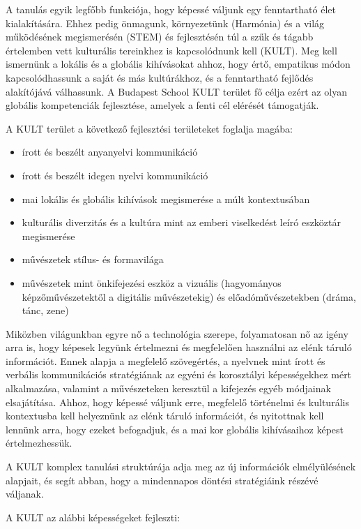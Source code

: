 A tanulás egyik legfőbb funkciója, hogy képessé váljunk egy fenntartható
élet kialakítására. Ehhez pedig önmagunk, környezetünk (Harmónia) és a
világ működésének megismerésén (STEM) és fejlesztésén túl a szűk és
tágabb értelemben vett kulturális tereinkhez is kapcsolódnunk kell
(KULT). Meg kell ismernünk a lokális és a globális kihívásokat ahhoz,
hogy értő, empatikus módon kapcsolódhassunk a saját és más kultúrákhoz,
és a fenntartható fejlődés alakítójává válhassunk. A Budapest \mbox{School}
KULT terület fő célja ezért az olyan globális kompetenciák fejlesztése,
amelyek a fenti cél elérését támogatják.

A KULT terület a következő fejlesztési területeket foglalja magába:

\begin{itemize}
\item
  írott és beszélt anyanyelvi kommunikáció
\item
  írott és beszélt idegen nyelvi kommunikáció
\item
  mai lokális és globális kihívások megismerése a múlt kontextusában
\item
  kulturális diverzitás és a kultúra mint az emberi viselkedést leíró
  eszköztár megismerése
\item
  művészetek stílus- és formavilága
\item
  művészetek mint önkifejezési eszköz a vizuális (hagyományos
  képzőművészetektől a digitális művészetekig) és előadóművészetekben
  (dráma, tánc, zene)
\end{itemize}

Miközben világunkban egyre nő a technológia szerepe, folyamatosan nő az
igény arra is, hogy képesek legyünk értelmezni és megfelelően használni
az elénk táruló információt. Ennek alapja a megfelelő szövegértés, a
nyelvnek mint írott és verbális kommunikációs stratégiának az egyéni és
korosztályi képességekhez mért alkalmazása, valamint a művészeteken
keresztül a kifejezés egyéb módjainak elsajátítása. Ahhoz, hogy képessé
váljunk erre, megfelelő történelmi és kulturális kontextusba kell
helyeznünk az elénk táruló információt, és nyitottnak kell lennünk arra,
hogy ezeket befogadjuk, és a mai kor globális kihívásaihoz képest
értelmezhessük.

A KULT komplex tanulási struktúrája adja meg az új információk
elmélyülésének alapjait, és segít abban, hogy a mindennapos döntési
stratégiáink részévé váljanak.

A KULT az alábbi képességeket fejleszti:

